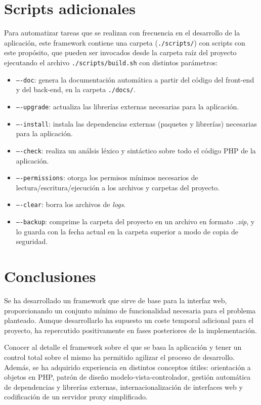 \section{Scripts adicionales\label{extra:mvc:scripts}}

Para automatizar tareas que se realizan con frecuencia en el desarrollo de la aplicación, este \gls{framework} contiene una carpeta (\texttt{./scripts/}) con \glspl{script} con este propósito, que pueden ser invocados desde la carpeta raíz del proyecto ejecutando el archivo \texttt{./scripts/build.sh} con distintos parámetros:
\begin{itemize}
  \item \texttt{----doc}: genera la documentación automática a partir del código del \gls{front-end} y del \gls{back-end}, en la carpeta \texttt{./docs/}.
  \item \texttt{----upgrade}: actualiza las librerías externas necesarias para la aplicación.
  \item \texttt{----install}: instala las dependencias externas (paquetes y librerías) necesarias para la aplicación.
  \item \texttt{----check}: realiza un análsis léxico y sintáctico sobre todo el código \gls{PHP} de la aplicación.
  \item \texttt{----permissions}: otorga los permisos mínimos necesarios de lectura/escritura/ejecución a los archivos y carpetas del proyecto.
  \item \texttt{----clear}: borra los archivos de \textit{logs}.
  \item \texttt{----backup}: comprime la carpeta del proyecto en un archivo en formato \textit{.zip}, y lo guarda con la fecha actual en la carpeta superior a modo de copia de seguridad.
\end{itemize}

\section{Conclusiones\label{extra:mvc:conclusiones}}

Se ha desarrollado un \gls{framework} que sirve de base para la interfaz web, proporcionando un conjunto mínimo de funcionalidad necesaria para el problema planteado.
Aunque desarrollarlo ha supuesto un coste temporal adicional para el proyecto, ha repercutido positivamente en fases posteriores de la implementación.

Conocer al detalle el \gls{framework} sobre el que se basa la aplicación y tener un control total sobre el mismo ha permitido agilizar el proceso de desarrollo.
Además, se ha adquirido experiencia en distintos conceptos útiles: orientación a objetos en \gls{PHP}, patrón de diseño modelo-vista-controlador, gestión automática de dependencias y librerías externas, internacionalización de interfaces web y codificación de un servidor \gls{proxy} simplificado.
